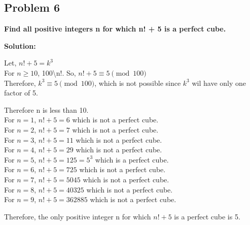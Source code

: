 \subsection{Problem 6}
\textbf{Find all positive integers n for which n! + 5 is a perfect cube.}
\par

\begin{flushleft}
\textbf{Solution: }
\par
Let, $ n! + 5 = k^3 $ \\
For $n\geq10$, 100\textbackslash n!.
So, $ n! + 5 \equiv 5 \pmod{100} $ \\
Therefore, $ k^3 \equiv 5 \pmod{100} $, which is not possible since $k^3$ wil have only one factor of 5.\\
\par
Therefore n is less than 10.\\
For $n = 1$, $n! + 5 = 6$ which is not a perfect cube.\\
For $n = 2$, $n! + 5 = 7$ which is not a perfect cube.\\
For $n = 3$, $n! + 5 = 11$ which is not a perfect cube.\\
For $n = 4$, $n! + 5 = 29$ which is not a perfect cube.\\
For $n = 5$, $n! + 5 = 125 = 5^3$ which is a perfect cube.\\
For $n = 6$, $n! + 5 = 725$ which is not a perfect cube.\\
For $n = 7$, $n! + 5 = 5045$ which is not a perfect cube.\\
For $n = 8$, $n! + 5 = 40325$ which is not a perfect cube.\\
For $n = 9$, $n! + 5 = 362885$ which is not a perfect cube.\\
\par
Therefore, the only positive integer n for which $n! + 5$ is a perfect cube is 5.
\end{flushleft}
